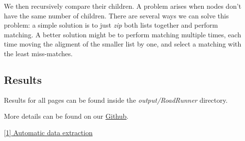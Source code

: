 \documentclass[runningheads]{llncs}
\begin{document}
We then recursively compare their children. A problem arises when nodes don't have the same number of children. There are several ways we can solve this problem: a simple solution is to just \textit{zip} both lists together and perform matching. A better solution might be to perform matching multiple times, each time moving the aligment of the smaller list by one, and select a matching with the least miss-matches.

\subsection{Results}

Results for all pages can be found inside the \textit{output/RoadRunner} directory.

More details can be found on our \href{https://github.com/LampDM/structured_data_extraction_methods/tree/master/RoadRunner}{Github}.

\href{https://www.researchgate.net/publication/221213613_RoadRunner_Automatic_data_extraction_from_data-intensive_Web_sites}{[1] Automatic data extraction}
\end{document}
